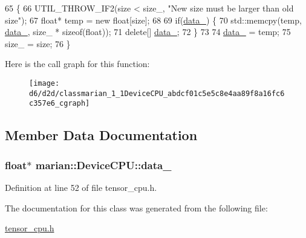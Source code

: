 \begin{DoxyCode}
65                             \{
66     UTIL\_THROW\_IF2(size < size\_, \textcolor{stringliteral}{"New size must be larger than old size"});
67     \textcolor{keywordtype}{float}* temp = \textcolor{keyword}{new} \textcolor{keywordtype}{float}[size];
68 
69     \textcolor{keywordflow}{if}(\hyperlink{classmarian_1_1DeviceCPU_ab572019008e518a425622428fe384501}{data\_}) \{
70       std::memcpy(temp, \hyperlink{classmarian_1_1DeviceCPU_ab572019008e518a425622428fe384501}{data\_}, size\_ * \textcolor{keyword}{sizeof}(\textcolor{keywordtype}{float}));
71       \textcolor{keyword}{delete}[] \hyperlink{classmarian_1_1DeviceCPU_ab572019008e518a425622428fe384501}{data\_};
72     \}
73 
74     \hyperlink{classmarian_1_1DeviceCPU_ab572019008e518a425622428fe384501}{data\_} = temp;
75     size\_ = size;
76   \}
\end{DoxyCode}


Here is the call graph for this function\+:
\nopagebreak
\begin{figure}[H]
\begin{center}
\leavevmode
\texttt{[image: d6/d2d/classmarian\_1\_1DeviceCPU\_abdcf01c5e5c8e4aa89f8a16fc6c357e6\_cgraph]}
\end{center}
\end{figure}




\subsection{Member Data Documentation}
\subsubsection[{\texorpdfstring{data\+\_\+}{data_}}]{\setlength{\rightskip}{0pt plus 5cm}float$\ast$ marian\+::\+Device\+C\+P\+U\+::data\+\_\+\hspace{0.3cm}{\ttfamily [private]}}\hypertarget{classmarian_1_1DeviceCPU_ab572019008e518a425622428fe384501}{}\label{classmarian_1_1DeviceCPU_ab572019008e518a425622428fe384501}


Definition at line 52 of file tensor\+\_\+cpu.\+h.



The documentation for this class was generated from the following file\+:\begin{DoxyCompactItemize}
\item 
\hyperlink{tensor__cpu_8h}{tensor\+\_\+cpu.\+h}\end{DoxyCompactItemize}
